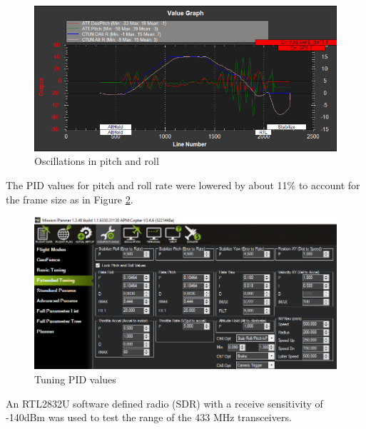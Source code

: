 \begin{figure}[H]
\centering
\includegraphics[scale=0.58]{images/pitch_alt.png}
\caption{Oscillations in pitch and roll}
\label{fig:leafy}
\end{figure}

The PID values for pitch and roll rate were lowered by about 11\% to account for the frame size as in Figure \ref{fig:tuning}.\\

\begin{figure}[H]
\centering
\includegraphics[scale=0.5]{images/tuning.PNG}
\caption{Tuning PID values}
\label{fig:tuning}
\end{figure}


An RTL2832U software defined radio (SDR) with a receive sensitivity of -140dBm was used to test the range of the 433 MHz transceivers.

